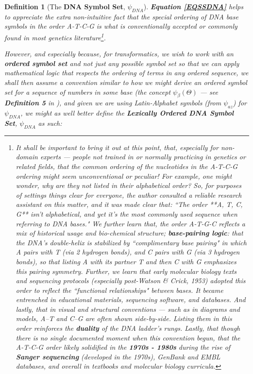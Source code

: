 \documentclass[a4paper, 18pt]{article} %
\newtheorem{defn}{Definition}
\begin{document}
{\begin{minipage}{0.9\textwidth}
\begin{defn}[The \textbf{DNA Symbol Set}, $\psi_{DNA}$]
\textbf{Equation \ref{EQSSDNA}} helps to appreciate the extra non-intuitive fact that the special ordering of DNA base symbols in the order A-T-C-G is what is conventionally accepted\cite{nature_atcg}\cite{wikipedia_nucleic_acid} or commonly found in most genetics literature\footnote{It shall be important to bring it out at this point, that, especially for non-domain experts --- people not trained in or normally practicing in genetics or related fields, that the common ordering of the nucleotides in the A-T-C-G ordering might seem unconventional or peculiar! For example, one might wonder, why are they not listed in their alphabetical order? So, for purposes of settings things clear for everyone, the author consulted a reliable research assistant on this matter\cite{copilot_dna_assistant}, and it was made clear that: ``The order **A, T, C, G** isn't alphabetical, and yet it's the most commonly used sequence when referring to DNA bases." We further learn that, the order A-T-G-C reflects a mix of historical usage and bio-chemical structure; \textbf{base-pairing logic}: that the DNA's double-helix is stabilized by ``complimentary base pairing" in which A pairs with T (via 2 hydrogen bonds), and C pairs with G (via 3 hydrogen bonds), so that listing A with its partner T and then C with G emphasizes this pairing symmetry\cite{copilot_dna_assistant}. Further, we learn that early molecular biology texts and sequencing protocols (especially post-Watson \& Crick, 1953) adopted this order to reflect the ``functional relationships" between bases. It became entrenched in educational materials, sequencing software, and databases. And lastly, that in visual and structural conventions --- such as in diagrams and models, A–T and C–G are often shown side-by-side. Listing them in this order reinforces the \textbf{duality} of the DNA ladder's rungs\cite{copilot_dna_assistant}. Lastly, that though there is no single documented moment when this convention begun, that the A-T-C-G order likely solidified in the \textbf{1970s - 1980s} during the rise of \textbf{Sanger sequencing} (developed in the 1970s), GenBank and EMBL databases, and overall in textbooks and molecular biology curricula.}.

However, and especially because, for transformatics, we wish to work with an \textbf{ordered symbol set}\cite{ossipaper} and not just \textit{any possible symbol set} so that we can apply mathematical logic that respects the ordering of terms in any ordered sequence\cite{transformatics}, we shall then assume a convention similar to how we might derive an ordered symbol set for a sequence of numbers in some base (the concept $\psi_\beta(\Theta)$ --- see \textbf{Definition 5} in \cite{ossipaper}), and given we are using Latin-Alphabet symbols (from $\psi_{az}$\cite{transformatics}) for $\psi_{DNA}$, we might as well better define the \textbf{Lexically Ordered DNA Symbol Set}, $\psi_{DNA}$ as such:


\end{defn}
\end{minipage}}
\end{document}
